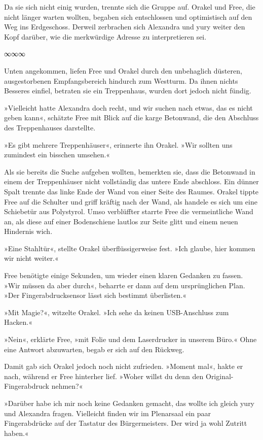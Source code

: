 Da sie sich nicht einig wurden, trennte sich die Gruppe auf. Orakel und Free, die nicht länger warten wollten, begaben sich entschlossen und optimistisch auf den Weg ins Erdgeschoss. Derweil zerbrachen sich Alexandra und yury weiter den Kopf darüber, wie die merkwürdige Adresse zu interpretieren sei.

\begin{center}
	∞∞∞
\end{center}

Unten angekommen, liefen Free und Orakel durch den unbehaglich düsteren, ausgestorbenen Empfangsbereich hindurch zum Westturm. Da ihnen nichts Besseres einfiel, betraten sie ein Treppenhaus, wurden dort jedoch nicht fündig.

»Vielleicht hatte Alexandra doch recht, und wir suchen nach etwas, das es nicht geben kann«, schätzte Free mit Blick auf die karge Betonwand, die den Abschluss des Treppenhauses darstellte.

»Es gibt mehrere Treppenhäuser«, erinnerte ihn Orakel. »Wir sollten uns zumindest ein bisschen umsehen.«

Als sie bereits die Suche aufgeben wollten, bemerkten sie, dass die Betonwand in einem der Treppenhäuser nicht vollständig das untere Ende abschloss. Ein dünner Spalt trennte das linke Ende der Wand von einer Seite des Raumes. Orakel tippte Free auf die Schulter und griff kräftig nach der Wand, als handele es sich um eine Schiebetür aus Polystyrol. Umso verblüffter starrte Free die vermeintliche Wand an, als diese auf einer Bodenschiene lautlos zur Seite glitt und einem neuen Hindernis wich.

»Eine Stahltür«, stellte Orakel überflüssigerweise fest. »Ich glaube, hier kommen wir nicht weiter.«

Free benötigte einige Sekunden, um wieder einen klaren Gedanken zu fassen. »Wir müssen da aber durch«, beharrte er dann auf dem ursprünglichen Plan. »Der Fingerabdrucksensor lässt sich bestimmt überlisten.«

»Mit Magie?«, witzelte Orakel. »Ich sehe da keinen USB-Anschluss zum Hacken.«

»Nein«, erklärte Free, »mit Folie und dem Laserdrucker in unserem Büro.« Ohne eine Antwort abzuwarten, begab er sich auf den Rückweg.

Damit gab sich Orakel jedoch noch nicht zufrieden. »Moment mal«, hakte er nach, während er Free hinterher lief. »Woher willst du denn den Original-Fingerabdruck nehmen?«

»Darüber habe ich mir noch keine Gedanken gemacht, das wollte ich gleich yury und Alexandra fragen. Vielleicht finden wir im Plenarsaal ein paar Fingerabdrücke auf der Tastatur des Bürgermeisters. Der wird ja wohl Zutritt haben.«

